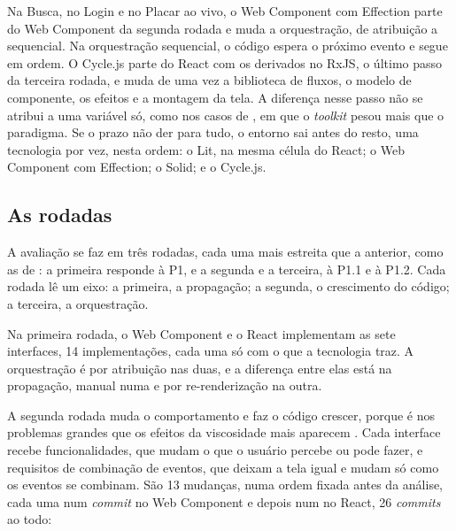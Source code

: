 Na Busca, no Login e no Placar ao vivo, o Web Component com Effection
parte do Web Component da segunda rodada e muda a orquestração, de
atribuição a sequencial.
Na orquestração sequencial, o código espera o próximo evento e segue
em ordem.
O Cycle.js parte do React com os derivados no RxJS, o último passo da
terceira rodada, e muda de uma vez a biblioteca de fluxos, o modelo de
componente, os efeitos e a montagem da tela.
A diferença nesse passo não se atribui a uma variável só, como nos
casos de \textcite[p. 23]{kiss2014}, em que o \emph{toolkit} pesou mais
que o paradigma.
Se o prazo não der para tudo, o entorno sai antes do resto, uma
tecnologia por vez, nesta ordem: o Lit, na mesma célula do React; o
Web Component com Effection; o Solid; e o Cycle.js.
\subsection{As rodadas}
\label{sec:as-rodadas}

A avaliação se faz em três rodadas, cada uma mais estreita que a
anterior, como as de \textcite[p. 3]{kiss2014}: a primeira responde à
P1, e a segunda e a terceira, à P1.1 e à P1.2.
Cada rodada lê um eixo: a primeira, a propagação; a segunda, o
crescimento do código; a terceira, a orquestração.

Na primeira rodada, o Web Component e o React implementam as sete
interfaces, 14 implementações, cada uma só com o que a tecnologia traz.
A orquestração é por atribuição nas duas, e a diferença entre elas está
na propagação, manual numa e por re-renderização na outra.

A segunda rodada muda o comportamento e faz o código crescer, porque é
nos problemas grandes que os efeitos da viscosidade mais aparecem
\cite[p. 161]{green1996d}.
Cada interface recebe funcionalidades, que mudam o que o usuário
percebe ou pode fazer, e requisitos de combinação de eventos, que deixam
a tela igual e mudam só como os eventos se combinam.
São 13 mudanças, numa ordem fixada antes da análise, cada uma num
\emph{commit} no Web Component e depois num no React, 26 \emph{commits} ao todo:

